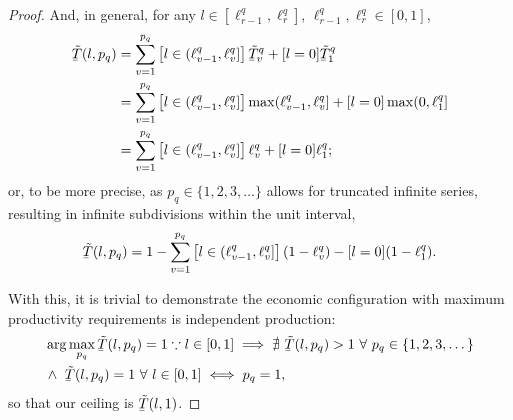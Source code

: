 \documentclass[hidelinks, nonatbib]{elsarticle}
\begin{document}
\begin{lemma}
\begin{proof}
        And, in general, for any $l \in [\ell_{r-1}^{q} ,\ell_{r}^{q}]$, $\ell_{r-1}^{q}, \ell_{r}^{q} \in [0,1]$,
        \begin{align}
            \underaccent{\bar}{\tilde{T}}(l, p_q)
            &=
            \sum_{v=1}^{p_q}\left[
                l \in (
                    \ell_{v-1}^{q}
                    ,\ell_{v}^{q}
                ]
            \right]
            \underaccent{\bar}{\tilde{T}}_{v}^{q}
            +
            [l = 0]
            \underaccent{\bar}{\tilde{T}}_{1}^{q}
            \\
            &=
            \sum_{v=1}^{p_q}\left[
                l \in (
                    \ell_{v-1}^{q}
                    ,\ell_{v}^{q}
                ]
            \right]
            \max(
                \ell_{v-1}^{q}
                ,\ell_{v}^{q}
            ]
            +
            [l = 0]
            \max(
                0
                ,\ell_{1}^{q}
            ]
            \\
            &=
            \sum_{v=1}^{p_q}\left[
                l \in (
                    \ell_{v-1}^{q}
                    ,\ell_{v}^{q}
                ]
            \right]
            \ell_{v}^{q}
            +
            [l = 0]
            \ell_{1}^{q}
            ;
        \end{align}
        or, to be more precise, as $p_q \in \{1,2,3,\dots \}$ allows for truncated infinite series, resulting in infinite subdivisions within the unit interval,
        \begin{gather}
            \label{mrp_series}
            \underaccent{\bar}{\tilde{T}}(l, p_q)
            =
            1 
            -
            \sum_{v=1}^{p_q}\left[
                l \in (
                    \ell_{v-1}^{q}
                    ,\ell_{v}^{q}
                ]
            \right]
            (1 - \ell_{v}^{q})
            -
            [l = 0]
            (1 - \ell_{1}^{q})
            .
        \end{gather}

        With this, it is trivial to demonstrate the economic configuration with maximum productivity requirements is independent production:
        \begin{align}
            &
            \arg\max_{p_q}{
                \underaccent{\bar}{\tilde{T}}(l, p_q)
            }
            =
            1
            \because
            l \in [0,1]
            \implies
            \nexists \
            \underaccent{\bar}{\tilde{T}}(l, p_q)
            >
            1
            \
            \forall
            \
            p_q \in \{1,2,3,\dots\}
            \\
            &
            \land \
            \underaccent{\bar}{\tilde{T}}(l, p_q)
            =
            1
            \
            \forall
            \
            l \in [0,1]
            \iff
            p_q = 1
            ,
        \end{align}
        so that our ceiling is $\underaccent{\bar}{\tilde{T}}(l, 1)$.


\end{proof}
\end{lemma}
\end{document}
